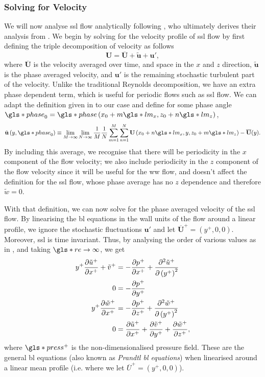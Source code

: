 \subsubsection{Solving for Velocity}
We will now analyse \gls{ssl} flow analytically following \textcite{chernyshenko2013}, who ultimately derives their analysis from \textcite{viotti2009}. We begin by solving for the velocity profile of \gls{ssl} flow by first defining the triple decomposition of velocity as follows
\begin{equation}
	\mathbf{U} = \overline{\mathbf{U} }+\tilde{\mathbf{u} }+\mathbf{u'}  
,\end{equation}
where $\overline{\mathbf{U} }$ is the velocity averaged over time, and space in the $x$ and  $z$ direction, $\tilde{\mathbf{u} }$ is the phase averaged velocity, and $\mathbf{u'} $ is the remaining stochastic turbulent part of the velocity. Unlike the traditional Reynolds decomposition, we have an extra phase dependent term, which is useful for periodic flows such as \gls{ssl} flow. We can adapt the definition given in \cite{baj2015} to our case and define for some phase angle $\gls*{phase}_0=\gls*{phase}\left(x_0+m \gls*{lm}_x,z_0+n \gls*{lm}_z\right)$,
\begin{equation}
	\tilde{\mathbf{u} }\left(y,\gls*{phase}_0\right)\equiv\lim_{M\to\infty}\lim_{N\to\infty}\frac{1}{M}\frac{1}{N} \sum_{m=1}^{M} \sum_{n=1}^{N} \mathbf{U}\left(x_0+n \gls*{lm}_x,y,z_0 +m \gls*{lm}_z\right)-\overline{\mathbf{U} }(y)  
.\end{equation}
By including this average, we recognise that there will be periodicity in the $x$ component of the flow velocity; we also include periodicity in the $z$ component of the flow velocity since it will be useful for the \gls{ww} flow, and doesn't affect the definition for the \gls{ssl} flow, whose phase average has no $z$ dependence and therefore $\tilde{w}=0$.

With that definition, we can now solve for the phase averaged velocity of the \gls{ssl} flow. By linearising the \gls{bl} equations in the wall units of the flow around a linear profile, we ignore the stochastic fluctuations $\mathbf{u'} $ and let $\overline{\mathbf{U} }^{+} = (y^{+},0,0)$. Moreover, \gls{ssl} is time invariant. Thus, by analysing the order of various values as in \cite{schlichting2016}, and taking $\gls*{re}\to \infty$, we get
\begin{align}
	y^{+} \pdv{\tilde{u}^{+}}{x^{+}} + \tilde{v}^{+} &= -\pdv{p^{+}}{x^{+}} + \pdv[2]{\tilde{u}^{+}}{\left(y^{+}\right)} \label{eq:blx}\\
	0 &= -\pdv{p^{+}}{y^{+}}  \label{eq:bly}\\
	y^{+} \pdv{\tilde{w}^{+}}{x^{+}} &= -\pdv{p^{+}}{z^{+}} + \pdv[2]{\tilde{w}^{+}}{\left( y^{+} \right) } \label{eq:blz}\\
	0 &= \pdv{\tilde{u}^{+}}{x^{+}} +\pdv{\tilde{v}^{+}}{y^{+}} +\pdv{\tilde{w}^{+}}{z^{+}} \label{eq:blc}
,\end{align}
where $\gls*{press}^{+}$ is the non-dimensionalised pressure field. These are the general \gls{bl} equations (also known as \textit{Prandtl \gls{bl} equations}) when linearised around a linear mean profile (i.e. where we let $\overline{U}^{+}=\left(y^{+},0,0\right)$).

